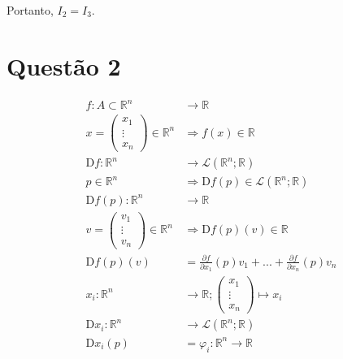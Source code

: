 \documentclass[12pt,a4paper]{article}
\begin{document}
		Portanto, $I_2 = I_3$.
		
		\begin{flushright}
		\end{flushright}
		
		\begin{flushright}
		\end{flushright}
		
		\begin{flushright}
		\end{flushright}
		
	\section{Quest\~ao 2}
		\begin{align}
			f : A \subset \mathbb{R}^n &\rightarrow \mathbb{R} \\
			x = \begin{pmatrix} x_1 \\ \vdots \\ x_n \end{pmatrix} \in \mathbb{R}^n &\Rightarrow f(x) \in \mathbb{R} \\
			\mathrm{D}f : \mathbb{R}^n &\rightarrow \mathcal{L}(\mathbb{R}^n ; \mathbb{R}) \\
			p \in \mathbb{R}^n &\Rightarrow \mathrm{D}f(p) \in \mathcal{L}(\mathbb{R}^n ; \mathbb{R}) \\
			\mathrm{D}f(p) : \mathbb{R}^n &\rightarrow \mathbb{R} \\
			v = \begin{pmatrix} v_1 \\ \vdots \\ v_n \end{pmatrix} \in \mathbb{R}^n &\Rightarrow \mathrm{D}f(p)(v) \in \mathbb{R} \\
			\mathrm{D}f(p)(v) &= \frac{\partial f}{\partial x_1} (p) v_1 + ... + \frac{\partial f}{\partial x_n} (p) v_n \\
			x_i : \mathbb{R}^n &\rightarrow \mathbb{R} ; \begin{pmatrix} x_1 \\ \vdots \\ x_n \end{pmatrix} \mapsto x_i \\
			\mathrm{D}x_i : \mathbb{R}^n &\rightarrow \mathcal{L}(\mathbb{R}^n ; \mathbb{R}) \\
			\mathrm{D}x_i (p) &= \varphi_i : \mathbb{R}^n \rightarrow \mathbb{R} \\

\end{align}
\end{document}
